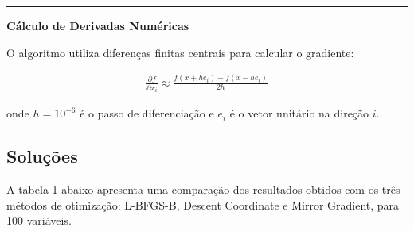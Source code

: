 \documentclass[12pt,a4paper]{article}
\begin{document}
\vspace{0.5cm}\hrule\vspace{0.5cm}\textbf{Cálculo de Derivadas Numéricas}

O algoritmo utiliza diferenças finitas centrais para calcular o gradiente:

\begin{align}
\frac{\partial f}{\partial x_i} \approx \frac{f(x + h e_i) - f(x - h e_i)}{2h}
\end{align}

onde $h = 10^{-6}$ é o passo de diferenciação e $e_i$ é o vetor unitário na direção $i$.


\newpage
\begin{landscape}
\subsection{Soluções}

A tabela 1 abaixo apresenta uma comparação dos resultados obtidos com os três métodos de otimização: L-BFGS-B, Descent Coordinate e Mirror Gradient, para 100 variáveis.




\end{landscape}
\end{document}

